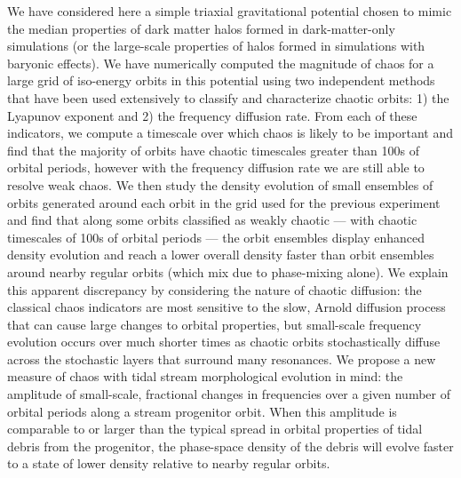 \documentclass[letterpaper,12pt,preprint]{aastex}
\begin{document}
We have considered here a simple triaxial gravitational potential chosen to mimic the median properties of dark matter halos formed in dark-matter-only simulations (or the large-scale properties of halos formed in simulations with baryonic effects). We have numerically computed the magnitude of chaos for a large grid of iso-energy orbits in this potential using two independent methods that have been used extensively to classify and characterize chaotic orbits: 1) the Lyapunov exponent and 2) the frequency diffusion rate. From each of these indicators, we compute a timescale over which chaos is likely to be important and find that the majority of orbits have chaotic timescales greater than 100s of orbital periods, however with the frequency diffusion rate we are still able to resolve weak chaos. We then study the density evolution of small ensembles of orbits generated around each orbit in the grid used for the previous experiment and find that along some orbits classified as weakly chaotic --- with chaotic timescales of 100s of orbital periods --- the orbit ensembles display enhanced density evolution and reach a lower overall density faster than orbit ensembles around nearby regular orbits (which mix due to phase-mixing alone). We explain this apparent discrepancy by considering the nature of chaotic diffusion: the classical chaos indicators are most sensitive to the slow, Arnold diffusion process that can cause large changes to orbital properties, but small-scale frequency evolution occurs over much shorter times as chaotic orbits stochastically diffuse across the stochastic layers that surround many resonances. We propose a new measure of chaos with tidal stream morphological evolution in mind: the amplitude of small-scale, fractional changes in frequencies over a given number of orbital periods along a stream progenitor orbit. When this amplitude is comparable to or larger than the typical spread in orbital properties of tidal debris from the progenitor, the phase-space density of the debris will evolve faster to a state of lower density relative to nearby regular orbits.
\end{document}
